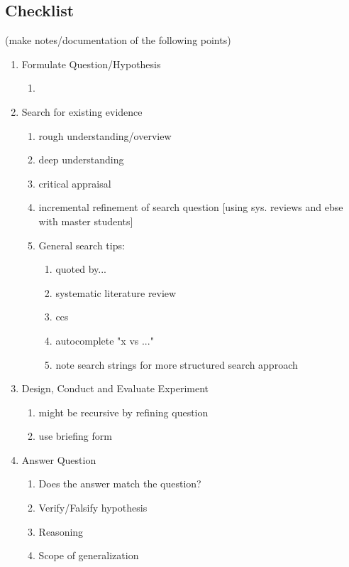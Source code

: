 
\newpage
\subsection{Checklist}

(make notes/documentation of the following points)


\begin{enumerate}  
	\item Formulate Question/Hypothesis
	\begin{enumerate} 
		\item {}
	\end{enumerate}

	
	\item Search for existing evidence
	\begin{enumerate} 
		\item rough understanding/overview
		\item deep understanding
		\item critical appraisal 
		\item incremental refinement of search question [using sys. reviews and ebse with master students]
		
		\item General search tips:
		\begin{enumerate}
			\item quoted by...
			\item systematic literature review
			\item ccs
			\item autocomplete "x vs ..."
			\item note search strings for more structured search approach
		\end{enumerate}
	\end{enumerate}


	\item Design, Conduct and Evaluate Experiment
	\begin{enumerate} 
		\item might be recursive by refining question
		\item use briefing form
	\end{enumerate}
	
	\item Answer Question
	\begin{enumerate} 
		\item Does the answer match the question?
		\item Verify/Falsify hypothesis
		\item Reasoning
		\item Scope of generalization
	\end{enumerate}
	

\end{enumerate}
